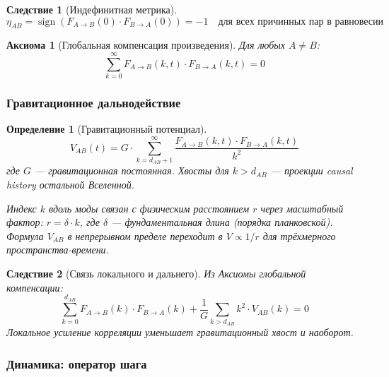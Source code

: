 \documentclass[12pt,a4paper]{article}
\newtheorem{definition}{Определение}[section]
\newtheorem{axiom}{Аксиома}[section]
\newtheorem{corollary}{Следствие}[section]
\begin{document}
\begin{corollary}[Индефинитная метрика]
\begin{equation}
    \eta_{AB} = \operatorname{sign}(F_{A \to B}(0) \cdot F_{B \to A}(0)) = -1 \quad \text{для всех причинных пар в равновесии}
\end{equation}
\end{corollary}

\begin{axiom}[Глобальная компенсация произведения]
Для любых $A \neq B$:
\begin{equation}
    \sum_{k=0}^{\infty} F_{A \to B}(k, t) \cdot F_{B \to A}(k, t) = 0
\end{equation}
\end{axiom}

\subsubsection{Гравитационное дальнодействие}

\begin{definition}[Гравитационный потенциал]
\begin{equation}
    V_{AB}(t) = G \cdot \sum_{k = d_{AB}+1}^{\infty} \frac{F_{A \to B}(k, t) \cdot F_{B \to A}(k, t)}{k^2}
\end{equation}
где $G$ --- гравитационная постоянная. Хвосты для $k > d_{AB}$ --- проекции causal history остальной Вселенной.

Индекс $k$ вдоль моды связан с физическим расстоянием $r$ через масштабный фактор: $r = \delta \cdot k$, где $\delta$ --- фундаментальная длина (порядка планковской). Формула $V_{AB}$ в непрерывном пределе переходит в $V \propto 1/r$ для трёхмерного пространства-времени.
\end{definition}

\begin{corollary}[Связь локального и дальнего]
Из Аксиомы глобальной компенсации:
\begin{equation}
    \sum_{k=0}^{d_{AB}} F_{A \to B}(k) \cdot F_{B \to A}(k) + \frac{1}{G} \sum_{k > d_{AB}} k^2 \cdot V_{AB}(k) = 0
\end{equation}
Локальное усиление корреляции уменьшает гравитационный хвост и наоборот.
\end{corollary}

\subsubsection{Динамика: оператор шага}
\end{document}
